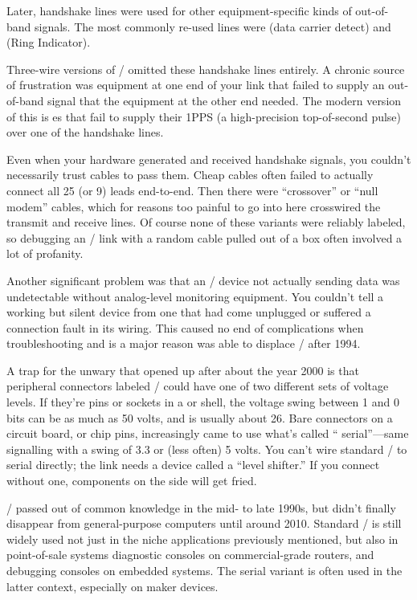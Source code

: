 Later, handshake lines were used for other equipment-specific kinds of
out-of-band signals. The most commonly re-used lines were  (data carrier
detect) and  (Ring Indicator).

Three-wire versions of \RSTTT/ omitted these handshake lines entirely. A chronic
source of frustration was equipment at one end of your link that failed to
supply an out-of-band signal that the equipment at the other end needed. The
modern version of this is es that fail to supply their 1PPS (a
high-precision top-of-second pulse) over one of the handshake lines.

Even when your hardware generated and received handshake signals, you couldn't
necessarily trust cables to pass them. Cheap cables often failed to actually
connect all 25 (or 9) leads end-to-end. Then there were ``crossover'' or ``null
modem'' cables, which for reasons too painful to go into here crosswired the
transmit and receive lines. Of course none of these variants were reliably
labeled, so debugging an \RSTTT/ link with a random cable pulled out of a box
often involved a lot of profanity.

Another significant problem was that an \RSTTT/ device not actually sending data
was undetectable without analog-level monitoring equipment. You couldn't tell a
working but silent device from one that had come unplugged or suffered a
connection fault in its wiring. This caused no end of complications when
troubleshooting and is a major reason  was able to displace \RSTTT/ after
1994.

A trap for the unwary that opened up after about the year 2000 is that
peripheral connectors labeled \RSTTT/ could have one of two different sets of
voltage levels. If they're pins or sockets in a  or  shell, the voltage
swing between 1 and 0 bits can be as much as 50 volts, and is usually about 26.
Bare connectors on a circuit board, or chip pins, increasingly came to use
what's called `` serial''---same signalling with a swing of 3.3 or (less
often) 5 volts. You can't wire standard \RSTTT/ to  serial directly; the link
needs a device called a ``level shifter.'' If you connect without one, components
on the  side will get fried.

\RSTTT/ passed out of common knowledge in the mid- to late 1990s, but didn't
finally disappear from general-purpose computers until around 2010. Standard
\RSTTT/ is still widely used not just in the niche applications previously
mentioned, but also in point-of-sale systems diagnostic consoles on
commercial-grade routers, and debugging consoles on embedded systems. The 
serial variant is often used in the latter context, especially on maker
devices.

